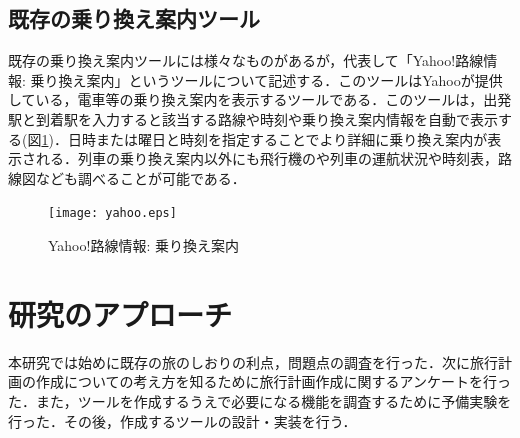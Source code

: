 \documentclass{funthesis}
\begin{document}
\section{既存の乗り換え案内ツール}
既存の乗り換え案内ツールには様々なものがあるが，代表して「Yahoo!路線情報: 乗り換え案内」\cite{yahoo}というツールについて記述する．このツールはYahooが提供している，電車等の乗り換え案内を表示するツールである．このツールは，出発駅と到着駅を入力すると該当する路線や時刻や乗り換え案内情報を自動で表示する(図\ref{Lyahoo})．日時または曜日と時刻を指定することでより詳細に乗り換え案内が表示される．列車の乗り換え案内以外にも飛行機のや列車の運航状況や時刻表，路線図なども調べることが可能である．

\begin{figure}[htpb]
\begin{center}
\texttt{[image: yahoo.eps]}
\end{center}
\caption{Yahoo!路線情報: 乗り換え案内}
\label{Lyahoo}
\end{figure}



\chapter{研究のアプローチ}%

本研究では始めに既存の旅のしおりの利点，問題点の調査を行った．次に旅行計画の作成についての考え方を知るために旅行計画作成に関するアンケートを行った．また，ツールを作成するうえで必要になる機能を調査するために予備実験を行った．その後，作成するツールの設計・実装を行う．






\end{document}
